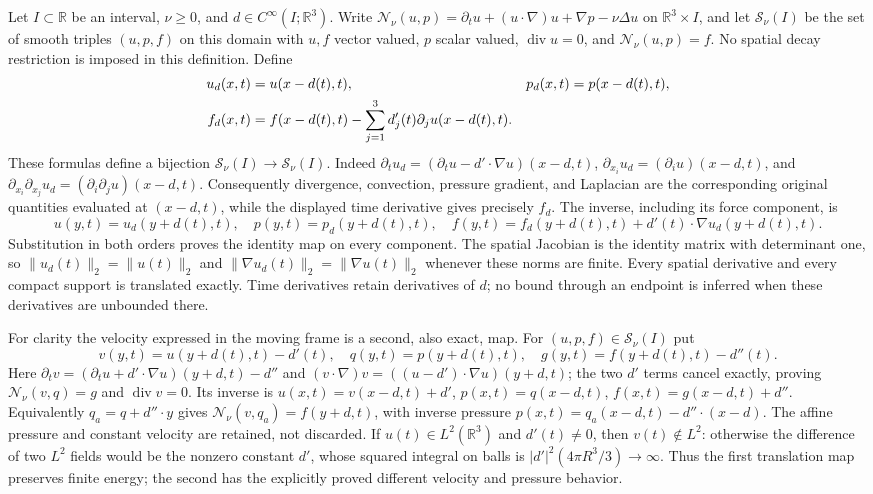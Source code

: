 Let $I\subset\mathbb R$ be an interval, $\nu\geq0$, and
$d\in C^\infty(I;\mathbb R^3)$. Write
$\mathcal N_\nu(u,p)=\partial_tu+(u\cdot\nabla)u+\nabla p-\nu\Delta u$
on $\mathbb R^3\times I$, and let $\mathcal S_\nu(I)$ be the set of smooth
triples $(u,p,f)$ on this domain with $u,f$ vector valued, $p$ scalar valued,
$\operatorname{div}u=0$, and $\mathcal N_\nu(u,p)=f$.
No spatial decay restriction is imposed in this definition. Define
\begin{align}
 u_d(x,t)&=u(x-d(t),t),&p_d(x,t)&=p(x-d(t),t),\notag\\
 f_d(x,t)&=f(x-d(t),t)
       -\sum_{j=1}^3d'_j(t)\partial_j u(x-d(t),t).
 \label{eq:wb-moving-translation}
\end{align}
These formulas define a bijection $\mathcal S_\nu(I)\to\mathcal S_\nu(I)$.
Indeed $\partial_tu_d=(\partial_tu-d'\cdot\nabla u)(x-d,t)$,
$\partial_{x_i}u_d=(\partial_i u)(x-d,t)$, and
$\partial_{x_i}\partial_{x_j}u_d=(\partial_i\partial_j u)(x-d,t)$.
Consequently divergence, convection, pressure gradient, and Laplacian
are the corresponding original quantities evaluated at $(x-d,t)$, while
the displayed time derivative gives precisely $f_d$.
The inverse, including its force component, is
\[
 u(y,t)=u_d(y+d(t),t),\quad p(y,t)=p_d(y+d(t),t),\quad
 f(y,t)=f_d(y+d(t),t)+d'(t)\cdot\nabla u_d(y+d(t),t).
\]
Substitution in both orders proves the identity map on every component.
The spatial Jacobian is the identity matrix with determinant one, so
$\|u_d(t)\|_2=\|u(t)\|_2$ and
$\|\nabla u_d(t)\|_2=\|\nabla u(t)\|_2$ whenever these norms are finite.
Every spatial derivative and every compact support is translated exactly.
Time derivatives retain derivatives of $d$; no bound through an endpoint
is inferred when these derivatives are unbounded there.

For clarity the velocity expressed in the moving frame is a second, also
exact, map. For $(u,p,f)\in\mathcal S_\nu(I)$ put
\[
 v(y,t)=u(y+d(t),t)-d'(t),\quad
 q(y,t)=p(y+d(t),t),\quad g(y,t)=f(y+d(t),t)-d''(t).
\]
Here $\partial_tv=(\partial_tu+d'\cdot\nabla u)(y+d,t)-d''$ and
$(v\cdot\nabla)v=((u-d')\cdot\nabla u)(y+d,t)$; the two $d'$ terms
cancel exactly, proving $\mathcal N_\nu(v,q)=g$ and
$\operatorname{div}v=0$. Its inverse is
$u(x,t)=v(x-d,t)+d'$, $p(x,t)=q(x-d,t)$,
$f(x,t)=g(x-d,t)+d''$.
Equivalently $q_a=q+d''\cdot y$ gives
$\mathcal N_\nu(v,q_a)=f(y+d,t)$, with inverse pressure
$p(x,t)=q_a(x-d,t)-d''\cdot(x-d)$.
The affine pressure and constant velocity are retained, not discarded.
If $u(t)\in L^2(\mathbb R^3)$ and $d'(t)\ne0$, then $v(t)\notin L^2$:
otherwise the difference of two $L^2$ fields would be the nonzero constant
$d'$, whose squared integral on balls is $|d'|^2(4\pi R^3/3)\to\infty$.
Thus the first translation map preserves finite energy; the second has
the explicitly proved different velocity and pressure behavior.

